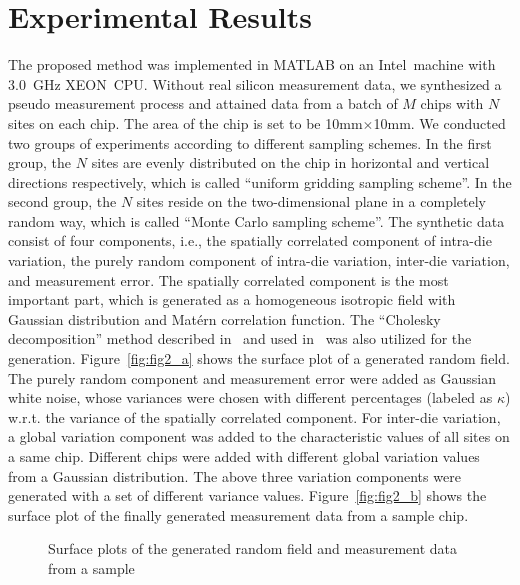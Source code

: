 \documentclass[referee]{ieice}
\begin{document}
\section{Experimental Results}
The proposed method was implemented in MATLAB on an Intel\textregistered~machine
with 3.0~GHz XEON\texttrademark~CPU.
Without real silicon measurement data, we synthesized a pseudo measurement process
and attained data from a batch of $M$ chips with $N$ sites on each chip.
The area of the chip is set to be 10mm$\times$10mm.
We conducted two groups of experiments according to different sampling schemes.
In the first group, the $N$ sites are evenly distributed on the chip in horizontal and vertical directions
respectively, which is called ``uniform gridding sampling scheme''.
In the second group, the $N$ sites reside on the two-dimensional plane in a completely random way,
which is called ``Monte Carlo sampling scheme''.
The synthetic data consist of four components, i.e., the spatially correlated component of intra-die variation,
the purely random component of intra-die variation, inter-die variation, and measurement error.
The spatially correlated component is the most important part, which is generated as a homogeneous
isotropic field with Gaussian distribution and Mat\'{e}rn correlation function.
The ``Cholesky decomposition'' method described in~\cite{Cressie91} and used in~\cite{Hargreaves08,Fu08}
was also utilized for the generation. Figure~\ref{fig:fig2_a} shows the surface plot of a generated random field.
The purely random component and measurement error were added as Gaussian white noise,
whose variances were chosen with different percentages (labeled as $\kappa$) w.r.t. the variance of
the spatially correlated component.
For inter-die variation, a global variation component was added to the characteristic values of all sites on a same chip. Different chips were added with different global variation values from a Gaussian distribution.
The above three variation components were generated with a set of different variance values.
Figure~\ref{fig:fig2_b} shows the surface plot of the finally generated measurement data from a sample chip.
\begin{figure}[tb]
  \centering
  \caption{Surface plots of the generated random field and measurement data from a sample}
  \label{fig:fig2} %
\end{figure}
\end{document}

